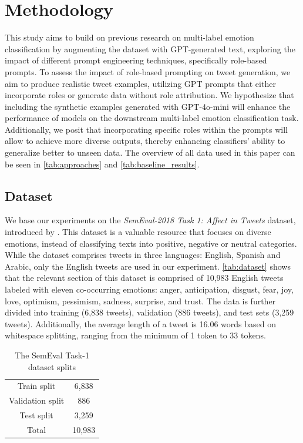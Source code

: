 \documentclass[manuscript]{clv3}
\begin{document}
\section{Methodology}
This study aims to build on previous research on multi-label emotion classification by augmenting the dataset with GPT-generated text, exploring the impact of different prompt engineering techniques, specifically role-based prompts. To assess the impact of role-based prompting on tweet generation, we aim to produce realistic tweet examples, utilizing GPT prompts that either incorporate roles or generate data without role attribution. We hypothesize that including the synthetic examples generated with GPT-4o-mini will enhance the performance of models on the downstream multi-label emotion classification task. Additionally, we posit that incorporating specific roles within the prompts will allow to achieve more diverse outputs, thereby enhancing classifiers' ability to generalize better to unseen data. The overview of all data used in this paper can be seen in \autoref{tab:approaches} and \autoref{tab:baseline_results}.

\subsection{Dataset}
We base our experiments on the \textit{SemEval-2018 Task 1: Affect in Tweets} dataset, introduced by \citet{mohammad-kiritchenko-2018-understanding}. This dataset is a valuable resource that focuses on diverse emotions, instead of classifying texts into positive, negative or neutral categories. While the dataset comprises tweets in three languages: English, Spanish and Arabic, only the English tweets are used in our experiment. \autoref{tab:dataset} shows that the relevant section of this dataset is comprised of 10,983 English tweets labeled with eleven co-occurring emotions: anger, anticipation, disgust, fear, joy, love, optimism, pessimism, sadness, surprise, and trust. The data is further divided into training (6,838 tweets), validation (886 tweets), and test sets (3,259 tweets). Additionally, the average length of a tweet is 16.06 words based on whitespace splitting, ranging from the minimum of 1 token to 33 tokens.

\begin{table}
    \centering
    \begin{tabular}{cc}
         Train split& 6,838\\
         Validation split& 886\\
         Test split& 3,259\\
         Total& 10,983\\
    \end{tabular}
    \caption{The SemEval Task-1 dataset splits}
    \label{tab:dataset}
\end{table}
\end{document}
